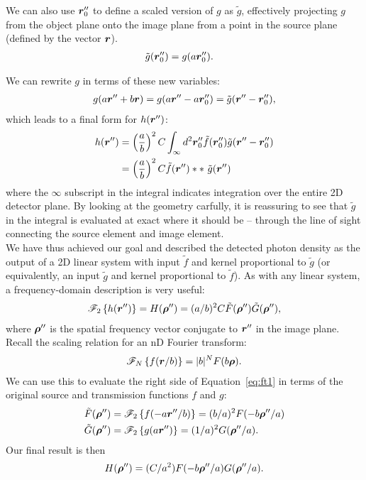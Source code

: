 \documentclass[mphy386-notes.tex]{subfiles}
\begin{document}

We can also use $\boldsymbol{r}_0''$ to define a scaled version of $g$ as $\tilde{g}$, effectively projecting
$g$ from the object plane onto the image plane from a point in the source plane (defined
by the vector $\boldsymbol{r}$).  
\begin{align}
  \tilde{g}(\boldsymbol{r}_0'') &= g(a\boldsymbol{r}_0'').
\end{align}

We can rewrite $g$ in terms of these new variables: 
\begin{align}
  g(a\boldsymbol{r}'' + b\boldsymbol{r}) = g(a\boldsymbol{r}''-a\boldsymbol{r}_0'') = \tilde{g}(\boldsymbol{r}'' - \boldsymbol{r}_0''),
\end{align}
which leads to a final form for $h(\boldsymbol{r}'')$:
\begin{align}
  h(\boldsymbol{r}'')&=\left(\frac{a}{b}\right)^2 C \int_{\infty} d^2\boldsymbol{r}_0'' \tilde{f}(\boldsymbol{r}_0'')\tilde{g}(\boldsymbol{r}'' - \boldsymbol{r}_0'')\nonumber\\
             &=\left(\frac{a}{b}\right)^2 C \tilde{f}(\boldsymbol{r}'') \ast \ast \text{ } \tilde{g}(\boldsymbol{r}'')
\end{align}
where the $\infty$ subscript in the integral indicates integration over the
entire 2D detector plane.  By looking at the geometry carfully, it is reassuring to see that $\tilde{g}$
in the integral is evaluated at exact where it should be -- through the line of sight connecting the
source element and image element.  \\

We have thus achieved our goal and described the
detected photon density as the output of a 2D linear system with input
$\tilde{f}$ and kernel proportional to $\tilde{g}$ (or equivalently, an input
$\tilde{g}$ and kernel proportional to $\tilde{f}$). As with any linear system, a
frequency-domain description is very useful:
\begin{align}
  \mathscr{F}_2\left\{h(\boldsymbol{r}'')\right\} = H(\boldsymbol{\rho}'') = (a/b)^2 C \tilde{F}(\boldsymbol{\rho}'')\tilde{G}(\boldsymbol{\rho}''),
  \label{eq:ft1}
\end{align}
where $\boldsymbol{\rho}''$ is the spatial frequency vector conjugate to $\boldsymbol{r}''$ in the image plane.
Recall the scaling relation for an nD Fourier transform:
\begin{align}
  \mathscr{F}_N\left\{f(\boldsymbol{r}/b)\right\} = |b|^N F(b\boldsymbol{\rho}).
\end{align}
We can use this to evaluate the right side of Equation~\ref{eq:ft1} in terms of the
original source and transmission functions $f$ and $g$:
\begin{align}
  \tilde{F}(\boldsymbol{\rho}'') &= \mathscr{F}_2\left\{f(-a\boldsymbol{r}''/b)\right\} = (b/a)^2 F(-b\boldsymbol{\rho}''/a)\\
  \tilde{G}(\boldsymbol{\rho}'') &= \mathscr{F}_2\left\{g(a\boldsymbol{r}'')\right\} = (1/a)^2 G(\boldsymbol{\rho}''/a).
\end{align}
Our final result is then
\begin{align}
  H(\boldsymbol{\rho}'') = (C/a^2)F(-b\boldsymbol{\rho}''/a)G(\boldsymbol{\rho}''/a).
  \label{eq:ft2}
\end{align}
\end{document}
